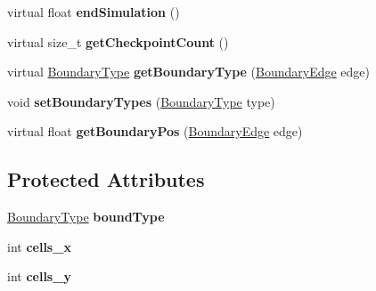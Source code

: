 \begin{DoxyCompactItemize}
\item 
\hypertarget{classSWE__Scenario_ae7ed72f584069e9885c33c4ca83f3ff5}{virtual float {\bfseries end\-Simulation} ()}\label{classSWE__Scenario_ae7ed72f584069e9885c33c4ca83f3ff5}

\item 
\hypertarget{classSWE__Scenario_a0c36b8d2bc8d1fc42af68309f958817a}{virtual size\-\_\-t {\bfseries get\-Checkpoint\-Count} ()}\label{classSWE__Scenario_a0c36b8d2bc8d1fc42af68309f958817a}

\item 
\hypertarget{classSWE__Scenario_ab8fe7ce15d7758fb0c4e0e3887b34a5d}{virtual \hyperlink{SWE__Scenario_8hh_af75d5dd7322fa39ed0af4e7839e600f8}{Boundary\-Type} {\bfseries get\-Boundary\-Type} (\hyperlink{SWE__Scenario_8hh_aa5e01e3f7df312f7b9b0d02521141fcc}{Boundary\-Edge} edge)}\label{classSWE__Scenario_ab8fe7ce15d7758fb0c4e0e3887b34a5d}

\item 
\hypertarget{classSWE__Scenario_aef7a53a5d791bee0545488735381c6a2}{void {\bfseries set\-Boundary\-Types} (\hyperlink{SWE__Scenario_8hh_af75d5dd7322fa39ed0af4e7839e600f8}{Boundary\-Type} type)}\label{classSWE__Scenario_aef7a53a5d791bee0545488735381c6a2}

\item 
\hypertarget{classSWE__Scenario_a1b01e953c2079b64f527c9bc5a0c86d7}{virtual float {\bfseries get\-Boundary\-Pos} (\hyperlink{SWE__Scenario_8hh_aa5e01e3f7df312f7b9b0d02521141fcc}{Boundary\-Edge} edge)}\label{classSWE__Scenario_a1b01e953c2079b64f527c9bc5a0c86d7}

\end{DoxyCompactItemize}
\subsection*{Protected Attributes}
\begin{DoxyCompactItemize}
\item 
\hypertarget{classSWE__Scenario_abe1a2cbf009889f9330091b9d28833f0}{\hyperlink{SWE__Scenario_8hh_af75d5dd7322fa39ed0af4e7839e600f8}{Boundary\-Type} {\bfseries bound\-Type}}\label{classSWE__Scenario_abe1a2cbf009889f9330091b9d28833f0}

\item 
\hypertarget{classSWE__Scenario_afa6dda8b7b69dc1514b26b8de5fa321b}{int {\bfseries cells\-\_\-x}}\label{classSWE__Scenario_afa6dda8b7b69dc1514b26b8de5fa321b}

\item 
\hypertarget{classSWE__Scenario_a4cd13fca6b6ab5290426b55b5dd755ff}{int {\bfseries cells\-\_\-y}}\label{classSWE__Scenario_a4cd13fca6b6ab5290426b55b5dd755ff}

\end{DoxyCompactItemize}


